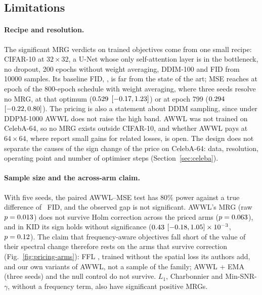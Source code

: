 \subsection{Limitations}
\label{sec:limitations}

\paragraph{Recipe and resolution.}
The significant MRG verdicts on trained objectives come from one small
recipe: CIFAR-10 at
$32\times32$, a U-Net whose only self-attention layer is in the bottleneck, no
dropout, 200 epochs without weight averaging, DDIM-100 and FID from
\num{10000} samples. Its baseline FID, \fidMSEmean, is far from the state of
the art; MSE reaches \longBestFIDMSE{} at epoch \longBestEpochMSE{} of the
800-epoch schedule with weight averaging, where three seeds resolve no MRG,
at that optimum ($0.529$ $[-0.17, 1.23]$) or at epoch
799 ($0.294$ $[-0.22, 0.80]$). The pricing is also a statement
about DDIM sampling, since under DDPM-1000 AWWL does not raise the high
band. AWWL was not trained on CelebA-64, so no MRG exists outside
CIFAR-10, and whether AWWL pays at $64\times64$, where
\citet{chandran2026spectral} report small gains for related losses, is open.
The design does not separate the causes of the sign change of the price on
CelebA-64: data, resolution, operating point and number of optimiser steps
(Section~\ref{sec:celeba}).

\paragraph{Sample size and the across-arm claim.}
With five seeds, the paired AWWL--MSE test has 80\% power against a true
difference of \mdeAWWL~FID, and the observed gap is not significant. AWWL's
MRG (raw $p = 0.013$) does not survive Holm correction across the
\nFamilyPricing{} priced arms ($p = 0.063$), and in KID its sign
holds without significance ($0.43$
$[-0.18, 1.05] \times 10^{-3}$, $p = 0.12$). The
claim that frequency-aware objectives fall short of the value of their
spectral change therefore rests on the arms that survive correction
(Fig.~\ref{fig:pricing-arms}): FFL \citep{jiang2021focal}, trained without
the spatial loss its authors add, and our own variants of AWWL, not a
sample of the family; AWWL + EMA (three seeds) and the null control do not
survive. $L_1$, Charbonnier and Min-SNR-$\gamma$, without a frequency term,
also have significant positive MRGs.

